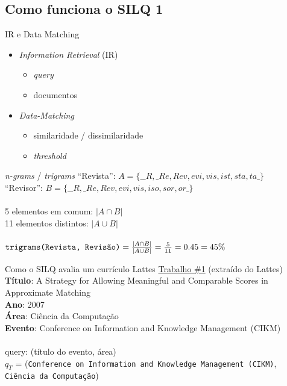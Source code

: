 \documentclass{beamer}
\newcommand{\quotes}[1]{``#1''}
\begin{document}
\subsection{Como funciona o SILQ 1}

\begin{frame}{IR e Data Matching}
  \begin{itemize}
    \item \textit{Information Retrieval} (IR)
    \begin{itemize}
      \item \textit{query}
      \item documentos
    \end{itemize}

    \item \textit{Data-Matching}
    \begin{itemize}
      \item similaridade / dissimilaridade
      \item \textit{threshold}
    \end{itemize}
  \end{itemize}
\end{frame}

\begin{frame}{\textit{n-grams} / \textit{trigrams}}
  \quotes{Revista}: $ A = \{\_\_R,\_Re,Rev,evi,vis,ist,sta,ta\_\}$ \\
  \quotes{Revisor}: $ B = \{\_\_R,\_Re,Rev,evi,vis,iso,sor,or\_\}$ \\

  \hfill \\
  5 elementos em comum: $|A \cap B|$\\
  11 elementos distintos: $|A \cup B|$\\

  \hfill \\
  $
  \texttt{trigrams(Revista, Revisão)} = {|A \cap B| \over |A \cup B|} = {5 \over 11} = 0.45 = 45\%
  $
\end{frame}

\begin{frame}{Como o SILQ avalia um currículo Lattes}
  \underline{Trabalho \#1} (extraído do Lattes)\\
  \textbf{Título}: A Strategy for Allowing Meaningful and Comparable Scores in Approximate Matching\\
  \textbf{Ano}: 2007\\
  \textbf{Área}: Ciência da Computação\\
  \textbf{Evento}: Conference on Information and Knowledge Management (CIKM)\\

  \pause
  \hfill \\
  query: (título do evento, área)\\
  $q_T$ = (\texttt{Conference on Information and Knowledge Management (CIKM)}, \texttt{Ciência da Computação})
\end{frame}
\end{document}
